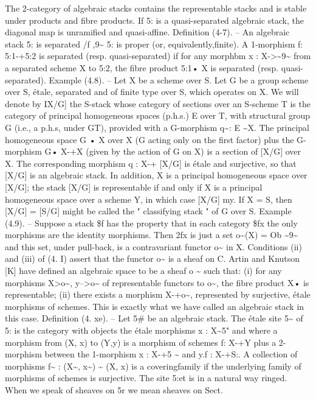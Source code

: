 \documentclass[11pt]{article}
\theoremstyle{plain}
\theoremstyle{definition}
\theoremstyle{remark}
\begin{document}
The 2-category of algebraic stacks contains the representable stacks and is stable under products and fibre products. If 5: is a quasi-separated algebraic stack, the diagonal map is unramified and quasi-affine. Definition (4-7). -- An algebraic stack 5: is separated /f ,9\textasciitilde{} 5: is proper (or, equivalently,finite). A 1-morphism f: 5:1-+5:2 is separated (resp. quasi-separated) if for any morphbm x : X->\textasciitilde{}9\textasciitilde{} from a separated scheme X to 5:2, the fibre product 5:1• X is separated (resp. quasi-separated). Example (4.8). -- Let X be a scheme over S. Let G be a group scheme over S, étale, separated and of finite type over S, which operates on X. We will denote by IX/G] the S-stack whose category of sections over an S-scheme T is the category of principal homogeneous spaces (p.h.s.) E over T, with structural group G (i.e., a p.h.s, under GT), provided with a G-morphism q\textasciitilde{}: E \textasciitilde{}X. The principal homogeneous space G • X over X (G acting only on the first factor) plus the G-morphism G• X-+X (given by the action of G on X) is a section of [X/G] over X. The corresponding morphism q : X-+ [X/G] is étale and surjective, so that [X/G] is an algebraic stack. In addition, X is a principal homogeneous space over [X/G]; the stack [X/G] is representable if and only if X is a principal homogeneous space over a scheme Y, in which case [X/G] my. If X = S, then [X/G] = [S/G] might be called the " classifying stack " of G over S. Example (4.9). -- Suppose a stack \$f has the property that in each category \$fx the only morphisms are the identity morphisms. Then 2fx is just a set o\textasciitilde{}(X) = Ob \textasciitilde{}9\textasciitilde{} and this set, under pull-back, is a contravariant functor o\textasciitilde{} in X. Conditions (ii) and (iii) of (4. I) assert that the functor o\textasciitilde{} is a sheaf on C. Artin and Knutson [K] have defined an algebraic space to be a sheaf o \textasciitilde{} such that: (i) for any morphisms X>o\textasciitilde{}, y-->o\textasciitilde{} of representable functors to o\textasciitilde{}, the fibre product X• is representable; (ii) there exists a morphism X-+o\textasciitilde{}, represented by surjective, étale morphisms of schemes. This is exactly what we have called an algebraic stack in this case. Definition (4. xe). -- Let 5\# be an algebraic stack. The étale site 5\textasciitilde{} of 5: is the category with objects the étale morphisms x : X\textasciitilde{}5" and where a morphism from (X, x) to (Y,y) is a morphism of schemes f: X-+Y plus a 2-morphism between the 1-morphism x : X-+5 \textasciitilde{} and y.f : X-+S:. A collection of morphisms f\textasciitilde{} : (X\textasciitilde{}, x\textasciitilde{}) \textasciitilde{} (X, x) is a coveringfamily if the underlying family of morphisms of schemes is surjective. The site 5:et is in a natural way ringed. When we speak of sheaves on 5r we mean sheaves on Sect.
\end{document}
